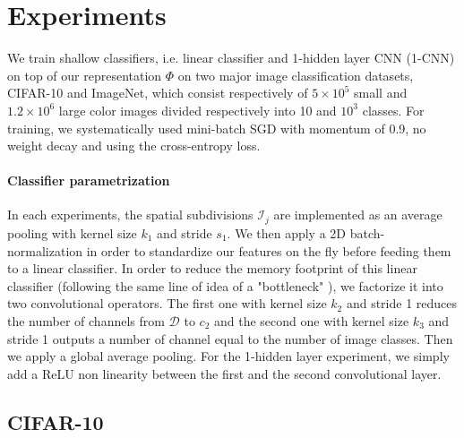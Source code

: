\documentclass{article} %
\begin{document}
\section{Experiments}
\label{experiments}
We train  shallow classifiers, i.e. linear classifier and 1-hidden layer CNN (1-CNN) on top of our representation $\Phi$ on two major  image classification datasets,  CIFAR-10 and ImageNet, which consist respectively of $5\times10^5$ small and $1.2\times10^6$ large color images  divided respectively into 10 and $10^3$ classes.
For training, we systematically used mini-batch SGD with momentum of 0.9, no weight decay and using the cross-entropy loss.


\paragraph{Classifier parametrization} In each experiments, the spatial subdivisions $\mathcal{I}_j$ are implemented as an average pooling with kernel size $k_1$ and stride $s_1$.
We then apply a 2D batch-normalization \citep{ioffe2015batch} in order to standardize our features on the fly before feeding them to a linear classifier.
In order to reduce the memory footprint of this linear classifier (following the same line of idea of a "bottleneck" \citep{he2016deep}), we factorize it into two convolutional operators.
The first one with kernel size $k_2$ and stride 1 reduces the number of channels from $\mathcal{D}$ to $c_2$ and the second one with kernel size $k_3$ and stride 1 outputs a number of channel equal to the number of image classes.
Then we apply a global average pooling.
For the 1-hidden layer experiment, we simply add a ReLU non linearity between the first and the second convolutional layer.




\subsection{CIFAR-10}
\end{document}
